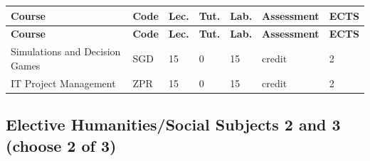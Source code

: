 \documentclass[12pt,a4paper]{article}
\newcommand{\thdrule}{\noalign{\global\setlength{\extrarowheight}{0pt}}}
\newcommand{\thdend}{\noalign{\global\setlength{\extrarowheight}{4pt}}}
\begin{document}
{\scriptsize
\begin{longtable}{m{5.5cm}m{0.8cm}m{1cm}m{1cm}m{1cm}m{1.7cm}m{0.7cm}}
\thdrule\toprule
\rowcolor{pjatkRed}
{\color{white}\footnotesize\textbf{\vphantom{Ag}Course}} & {\color{white}\footnotesize\textbf{\vphantom{Ag}Code}} & {\color{white}\footnotesize\textbf{\vphantom{Ag}Lec.}} & {\color{white}\footnotesize\textbf{\vphantom{Ag}Tut.}} & {\color{white}\footnotesize\textbf{\vphantom{Ag}Lab.}} & {\color{white}\footnotesize\textbf{\vphantom{Ag}Assessment}} & {\color{white}\footnotesize\textbf{\vphantom{Ag}ECTS}} \\
\midrule\thdend
\endfirsthead
\thdrule\toprule
\rowcolor{pjatkRed}
{\color{white}\footnotesize\textbf{\vphantom{Ag}Course}} & {\color{white}\footnotesize\textbf{\vphantom{Ag}Code}} & {\color{white}\footnotesize\textbf{\vphantom{Ag}Lec.}} & {\color{white}\footnotesize\textbf{\vphantom{Ag}Tut.}} & {\color{white}\footnotesize\textbf{\vphantom{Ag}Lab.}} & {\color{white}\footnotesize\textbf{\vphantom{Ag}Assessment}} & {\color{white}\footnotesize\textbf{\vphantom{Ag}ECTS}} \\
\midrule\thdend
\endhead
\rowcolor{tableRowLight} Simulations and Decision Games & SGD & 15 & 0 & 15 & {\scriptsize credit} & 2 \\
\rowcolor{tableRowAlt} IT Project Management & ZPR & 15 & 0 & 15 & {\scriptsize credit} & 2 \\
\bottomrule
\end{longtable}}

\subsection*{Elective Humanities/Social Subjects 2 and 3 (choose 2 of 3)}
\end{document}
